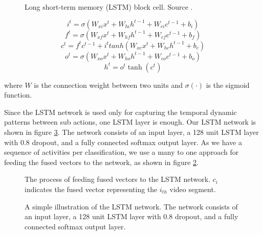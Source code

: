 \begin{figure}
  \centering
  
  \caption{Long short-term memory (LSTM) block cell. Source \cite{Graves2008supervised}.}\label{fi:lstmblock}
\end{figure}

\begin{equation}
i^{t} = \sigma (W_{xi}x^t + W_{hi}h^{t-1} + W_{ci}c^{t-1} + b_{i})
\end{equation}
\begin{equation}
f^{t} = \sigma (W_{xf}x^t + W_{hf}h^{t-1} + W_{cf}c^{t-1} + b_{f})
\end{equation}
\begin{equation}
c^{t} = f^tc^{t-1} + i^ttanh(W_{xc}x^t + W_{hc}h^{t-1} + b_{c})
\end{equation}
\begin{equation}
o^{t} = \sigma (W_{xo}x^t + W_{ho}h^{t-1} + W_{co}c^{t-1} + b_{o})
\end{equation}
\begin{equation}
h^t = o^t\tanh(c^t)
\end{equation}

where $W$ is the connection weight between two units and $\sigma(\cdot)$ is the sigmoid function.

Since the LSTM network is used only for capturing the temporal dynamic patterns between sub actions, one LSTM layer is enough.
Our LSTM network is shown in figure \ref{fi:layers}. The network consists of an input layer, a 128 unit LSTM layer with 0.8 dropout, and
a fully connected softmax output layer. As we have a sequence of activities per classification, we use a many to one approach
for feeding the fused vectors to the network, as shown in figure \ref{fi:lstm}.

\begin{figure}
  \centering
  
  \caption{The process of feeding fused vectors to the LSTM network. $c_{i}$ indicates the fused vector representing the $i_{th}$
  video segment.}\label{fi:lstm}
\end{figure}

\begin{figure}
  \centering
  
  \caption{A simple illustration of the LSTM network. The network consists of an input layer, a 128 unit LSTM layer with 0.8 dropout, and
a fully connected softmax output layer.}\label{fi:layers}
\end{figure}

